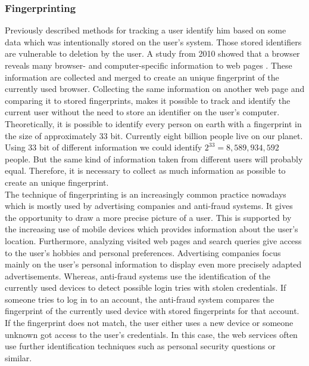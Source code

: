 		\subsubsection{Fingerprinting}
			
			Previously described methods for tracking a user identify him based on some data which was intentionally stored on the user's system. Those stored identifiers are vulnerable to deletion by the user. A study from 2010 showed that a browser reveals many browser- and computer-specific information to web pages \cite{Eckersley:2010:UYW:1881151.1881152}. These information are collected and merged to create an unique fingerprint of the currently used browser. Collecting the same information on another web page and comparing it to stored fingerprints, makes it possible to track and identify the current user without the need to store an identifier on the user's computer. Theoretically, it is possible to identify every person on earth with a fingerprint in the size of approximately 33 bit. Currently eight billion people live on our planet. Using 33 bit of different information we could identify $2^{33}=8,589,934,592$ people. But the same kind of information taken from different users will probably equal. Therefore, it is necessary to collect as much information as possible to create an unique fingerprint. \\
			
			The technique of fingerprinting is an increasingly common practice nowadays which is mostly used by advertising companies and anti-fraud systems. It gives the opportunity to draw a more precise picture of a user. This is supported by the increasing use of mobile devices which provides information about the user's location. Furthermore, analyzing visited web pages and search queries give access to the user's hobbies and personal preferences. Advertising companies focus mainly on the user's personal information to display even more precisely adapted advertisements. Whereas, anti-fraud systems use the identification of the currently used devices to detect possible login tries with stolen credentials. If someone tries to log in to an account, the anti-fraud system compares the fingerprint of the currently used device with stored fingerprints for that account. If the fingerprint does not match, the user either uses a new device or someone unknown got access to the user's credentials. In this case, the web services often use further identification techniques such as personal security questions or similar. \\
			
